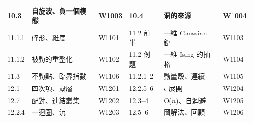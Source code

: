\documentclass[11pt,a4paper]{article}
\begin{document}
\begin{center}
\begin{tabular}{@{}lll@{\qquad}lll@{}}
10.3 & 自旋波、負一個模態 & W1003 & 10.4 & 洞的來源 & W1004\\
\midrule
11.1.1 & 碎形、維度 & W1101 & 11.2 前半 & 一維 Gaussian 鏈 & W1103\\
11.1.2 & 被動的重整化 & W1102 & 11.2 例題 & 一維 Ising 的抽格 & W1104\\
11.3 & 不動點、臨界指數 & W1106 & 11.2.1--2 & 動量殼、連續 & W1105\\
\midrule
12.1 & 四次項、殼層 & W1201 & 12.2.5--6 & $\epsilon$ 展開 & W1204\\
12.7 & 配對、連結叢集 & W1202 & 12.3--4 & O($n$)、自迴避 & W1205\\
12.2.4 & 一迴圈、流 & W1203 & 12.5--6 & 圖解法、回顧 & W1206\\
\bottomrule
\end{tabular}
\end{center}
\end{document}
